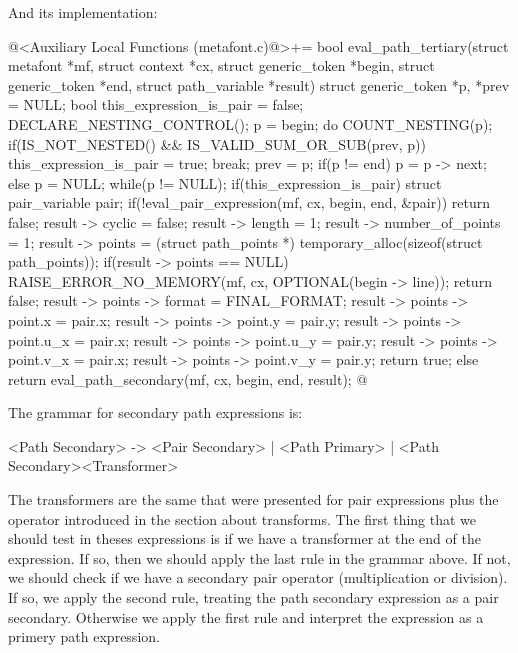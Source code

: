 {{{{{And its implementation:

\iniciocodigo
@<Auxiliary Local Functions (metafont.c)@>+=
bool eval_path_tertiary(struct metafont *mf, struct context *cx,
                        struct generic_token *begin,
                        struct generic_token *end,
                        struct path_variable *result){
  struct generic_token *p, *prev = NULL;
  bool this_expression_is_pair = false;
  DECLARE_NESTING_CONTROL();
  p = begin;
  do{
    COUNT_NESTING(p);
    if(IS_NOT_NESTED() && IS_VALID_SUM_OR_SUB(prev, p)){
      this_expression_is_pair = true;
      break;
    }
    prev = p;
    if(p != end)
      p = p -> next;
    else
      p = NULL;
  }while(p != NULL);
  if(this_expression_is_pair){
    struct pair_variable pair;
    if(!eval_pair_expression(mf, cx, begin, end, &pair))
      return false;
    result -> cyclic = false;
    result -> length = 1;
    result -> number_of_points = 1;
    result -> points = (struct path_points *)
                         temporary_alloc(sizeof(struct path_points));
    if(result -> points == NULL){
      RAISE_ERROR_NO_MEMORY(mf, cx, OPTIONAL(begin -> line));
      return false;
    }
    result -> points -> format = FINAL_FORMAT;
    result -> points -> point.x = pair.x;
    result -> points -> point.y = pair.y;
    result -> points -> point.u_x = pair.x;
    result -> points -> point.u_y = pair.y;
    result -> points -> point.v_x = pair.x;
    result -> points -> point.v_y = pair.y;
    return true;
  }
  else
    return eval_path_secondary(mf, cx, begin, end, result);
}
@
\fimcodigo


The grammar for secondary path expressions is:

\alinhaverbatim
<Path Secondary> -> <Pair Secondary> | <Path Primary> |
                    <Path Secondary><Transformer>
\alinhanormal

The transformers are the same that were presented for pair expressions
plus the  operator introduced in the section
about transforms. The first thing that we should test in theses
expressions is if we have a transformer at the end of the
expression. If so, then we should apply the last rule in the grammar
above. If not, we should check if we have a secondary pair operator
(multiplication or division). If so, we apply the second rule,
treating the path secondary expression as a pair secondary. Otherwise
we apply the first rule and interpret the expression as a primery path
expression.

}}}}}

